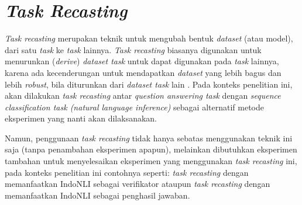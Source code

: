 \section{\emph{Task Recasting}}
\emph{Task recasting} merupakan teknik untuk mengubah bentuk \emph{dataset} (atau model), dari satu \emph{task} ke \emph{task} lainnya. \emph{Task recasting} biasanya digunakan untuk menurunkan (\emph{derive}) \emph{dataset task} untuk dapat digunakan pada \emph{task} lainnya, karena ada kecenderungan untuk mendapatkan \emph{dataset} yang lebih bagus dan lebih \emph{robust}, bila diturunkan dari \emph{dataset task} lain \citep{DBLP:journals/corr/abs-1809-02922}. Pada konteks penelitian ini, akan dilakukan \emph{task recasting} antar \emph{question answering task} dengan \emph{sequence classification task (natural language inference)} sebagai alternatif metode eksperimen yang nanti akan dilaksanakan. 

Namun, penggunaan \emph{task recasting} tidak hanya sebatas menggunakan teknik ini saja (tanpa penambahan eksperimen apapun), melainkan dibutuhkan eksperimen tambahan untuk menyelesaikan eksperimen yang menggunakan \emph{task recasting} ini, pada konteks penelitian ini contohnya seperti: \emph{task recasting} dengan memanfaatkan IndoNLI sebagai verifikator ataupun \emph{task recasting} dengan memanfaatkan IndoNLI sebagai penghasil jawaban.